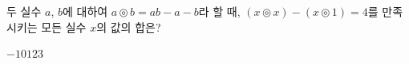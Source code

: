 두 실수 $a$, $b$에 대하여 $a\circledcirc b=ab-a-b$라 할 때, $(x\circledcirc x)-(x\circledcirc 1)=4$를 만족시키는 모든 실수 $x$의 값의 합은?
\begin{choices32}{$-1$}{$0$}{$1$}{$2$}{$3$}\end{choices32}
